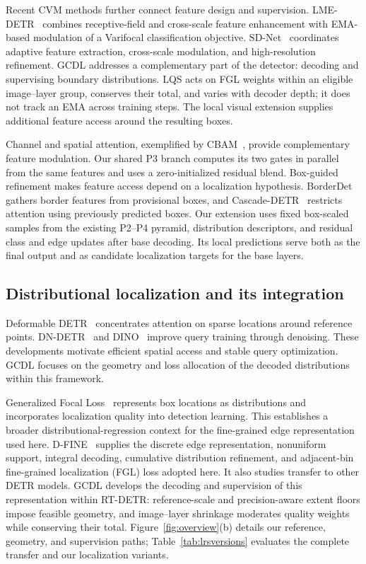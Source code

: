 Recent CVM methods further connect feature design and supervision. LME-DETR~\cite{xu2026lme} combines receptive-field and cross-scale feature enhancement with EMA-based modulation of a Varifocal classification objective. SD-Net~\cite{yang2026sdnet} coordinates adaptive feature extraction, cross-scale modulation, and high-resolution refinement. GCDL addresses a complementary part of the detector: decoding and supervising boundary distributions. LQS acts on FGL weights within an eligible image--layer group, conserves their total, and varies with decoder depth; it does not track an EMA across training steps. The local visual extension supplies additional feature access around the resulting boxes.

Channel and spatial attention, exemplified by CBAM~\cite{woo2018cbam}, provide complementary feature modulation. Our shared P3 branch computes its two gates in parallel from the same features and uses a zero-initialized residual blend. Box-guided refinement makes feature access depend on a localization hypothesis. BorderDet~\cite{qiu2020borderdet} gathers border features from provisional boxes, and Cascade-DETR~\cite{ye2023cascadedetr} restricts attention using previously predicted boxes. Our extension uses fixed box-scaled samples from the existing P2--P4 pyramid, distribution descriptors, and residual class and edge updates after base decoding. Its local predictions serve both as the final output and as candidate localization targets for the base layers.

\subsection{Distributional localization and its integration}
Deformable DETR~\cite{zhu2021deformable} concentrates attention on sparse locations around reference points. DN-DETR~\cite{li2022dndetr} and DINO~\cite{zhang2023dino} improve query training through denoising. These developments motivate efficient spatial access and stable query optimization. GCDL focuses on the geometry and loss allocation of the decoded distributions within this framework.

Generalized Focal Loss~\cite{li2020gfl} represents box locations as distributions and incorporates localization quality into detection learning. This establishes a broader distributional-regression context for the fine-grained edge representation used here. D-FINE~\cite{peng2025dfine} supplies the discrete edge representation, nonuniform support, integral decoding, cumulative distribution refinement, and adjacent-bin fine-grained localization (FGL) loss adopted here. It also studies transfer to other DETR models. GCDL develops the decoding and supervision of this representation within RT-DETR: reference-scale and precision-aware extent floors impose feasible geometry, and image--layer shrinkage moderates quality weights while conserving their total. Figure~\ref{fig:overview}(b) details our reference, geometry, and supervision paths; Table~\ref{tab:lrsversions} evaluates the complete transfer and our localization variants.

